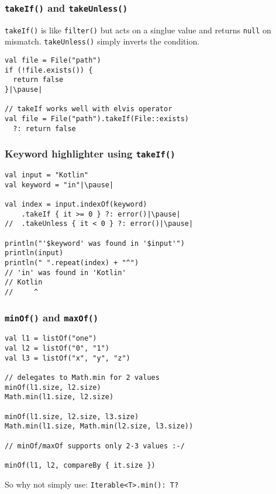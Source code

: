 
\begin{frame}[fragile] \frametitle{\texttt{takeIf()} and \texttt{takeUnless()}}
\texttt{takeIf()} is like \texttt{filter()} but acts on a singlue value and returns \texttt{null} on mismatch. \texttt{takeUnless()} simply inverts the condition.
\begin{lstlisting}
val file = File("path")
if (!file.exists()) {
  return false
}|\pause|

// takeIf works well with elvis operator
val file = File("path").takeIf(File::exists)
  ?: return false
\end{lstlisting}
\end{frame}

\begin{frame}[fragile] \frametitle{Keyword highlighter using \texttt{takeIf()}}
\begin{lstlisting}
val input = "Kotlin"
val keyword = "in"|\pause|

val index = input.indexOf(keyword)
    .takeIf { it >= 0 } ?: error()|\pause|
//  .takeUnless { it < 0 } ?: error()|\pause|

println("'$keyword' was found in '$input'")
println(input)
println(" ".repeat(index) + "^")
// 'in' was found in 'Kotlin'
// Kotlin
//     ^
\end{lstlisting}
\end{frame}


\begin{frame}[fragile] \frametitle{\texttt{minOf()} and \texttt{maxOf()}}
\begin{lstlisting}
val l1 = listOf("one")
val l2 = listOf("0", "1")
val l3 = listOf("x", "y", "z")

// delegates to Math.min for 2 values
minOf(l1.size, l2.size)
Math.min(l1.size, l2.size)

minOf(l1.size, l2.size, l3.size)
Math.min(l1.size, Math.min(l2.size, l3.size))

// minOf/maxOf supports only 2-3 values :-/

minOf(l1, l2, compareBy { it.size })
\end{lstlisting}
So why not simply use: \texttt{Iterable<T>.min(): T?}
\end{frame}

